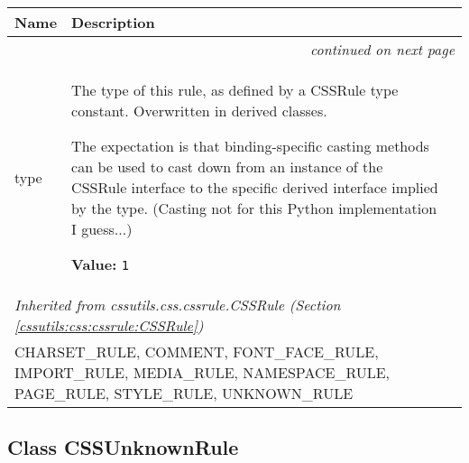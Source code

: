    \vspace{-1cm}
\hspace{\varindent}\begin{longtable}{|p{\varnamewidth}|p{\vardescrwidth}|l}
\cline{1-2}
\cline{1-2} \centering \textbf{Name} & \centering \textbf{Description}& \\
\cline{1-2}
\endhead\cline{1-2}\multicolumn{3}{r}{\small\textit{continued on next page}}\\\endfoot\cline{1-2}
\endlastfoot\raggedright t\-y\-p\-e\- & \raggedright The type of this rule, as defined by a CSSRule type constant.
Overwritten in derived classes.

The expectation is that binding-specific casting methods can be used to
cast down from an instance of the CSSRule interface to the specific
derived interface implied by the type.
(Casting not for this Python implementation I guess...)

\textbf{Value:} 
{\tt 1}&\\
\cline{1-2}
\multicolumn{2}{|l|}{\textit{Inherited from cssutils.css.cssrule.CSSRule \textit{(Section \ref{cssutils:css:cssrule:CSSRule})}}}\\
\multicolumn{2}{|p{\varwidth}|}{\raggedright CHARSET\_RULE, COMMENT, FONT\_FACE\_RULE, IMPORT\_RULE, MEDIA\_RULE, NAMESPACE\_RULE, PAGE\_RULE, STYLE\_RULE, UNKNOWN\_RULE}\\
\cline{1-2}
\end{longtable}



\subsection{Class CSSUnknownRule}

